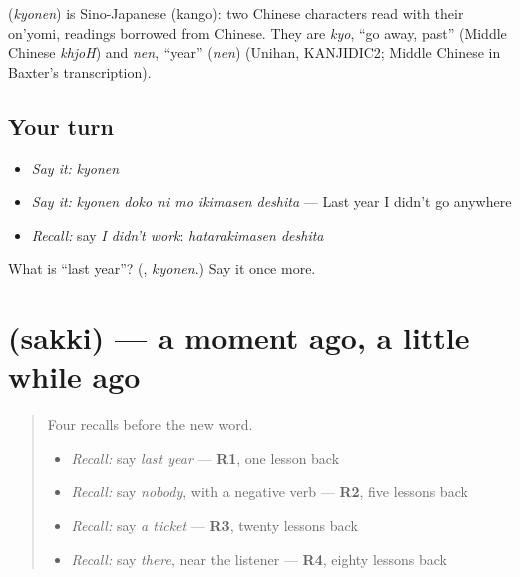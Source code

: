 \begin{cousinweb}
\textbf{} (\emph{kyonen}) is Sino-Japanese (kango): two Chinese characters read with their on'yomi, readings borrowed from Chinese. They are \emph{kyo}, \textquotedblleft{}go away, past\textquotedblright{} (Middle Chinese \emph{khjoH}) and \emph{nen}, \textquotedblleft{}year\textquotedblright{} (\emph{nen}) (Unihan, KANJIDIC2; Middle Chinese in Baxter's transcription).
\end{cousinweb}

\subsection*{Your turn}
\begin{itemize}
\raggedright
  \item \emph{Say it:} \emph{kyonen}
  \item \emph{Say it:} \emph{kyonen doko ni mo ikimasen deshita} — Last year I didn't go anywhere
  \item \emph{Recall:} say \emph{I didn't work}: \emph{hatarakimasen deshita}
\end{itemize}

\begin{tcolorbox}[breakable,colback=teal!4,colframe=teal!35!black,title={Before you move on}]
What is \textquotedblleft{}last year\textquotedblright{}? (\textbf{}, \emph{kyonen}.) Say it once more.
\end{tcolorbox}
\section[\texorpdfstring{\ja{さっき} (sakki)}{さっき (sakki)}]{ (sakki) — a moment ago, a little while ago}

\label{lesson:JA-C140-sakki}



\begin{quote}
Four recalls before the new word.

\begin{itemize}
\raggedright
  \item \emph{Recall:} say \emph{last year} — \textbf{R1}, one lesson back
  \item \emph{Recall:} say \emph{nobody}, with a negative verb — \textbf{R2}, five lessons back
  \item \emph{Recall:} say \emph{a ticket} — \textbf{R3}, twenty lessons back
  \item \emph{Recall:} say \emph{there}, near the listener — \textbf{R4}, eighty lessons back
\end{itemize}
\end{quote}


